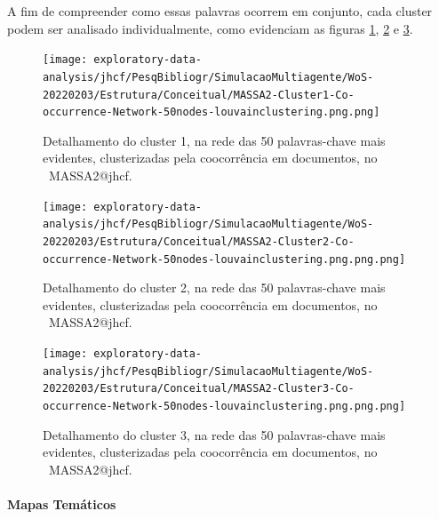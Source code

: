 A fim de compreender como essas palavras ocorrem em conjunto, cada cluster podem ser analisado individualmente, como evidenciam as figuras \ref{fig:MASSA2-Cluster1-Co-occurrence-Network-50nodes-louvainclustering.png}, \ref{fig:MASSA2-Cluster2-Co-occurrence-Network-50nodes-louvainclustering.png.png} e \ref{fig:MASSA2-Cluster3-Co-occurrence-Network-50nodes-louvainclustering.png.png}.

\begin{figure}
    \centering
    \texttt{[image: exploratory-data-analysis/jhcf/PesqBibliogr/SimulacaoMultiagente/WoS-20220203/Estrutura/Conceitual/MASSA2-Cluster1-Co-occurrence-Network-50nodes-louvainclustering.png.png]}
    \caption{Detalhamento do cluster 1, na rede das 50 palavras-chave mais evidentes, clusterizadas pela coocorrência em documentos, no  \dataset\ MASSA2@jhcf.}
    \label{fig:MASSA2-Cluster1-Co-occurrence-Network-50nodes-louvainclustering.png}
\end{figure}

\begin{figure}
    \centering
    \texttt{[image: exploratory-data-analysis/jhcf/PesqBibliogr/SimulacaoMultiagente/WoS-20220203/Estrutura/Conceitual/MASSA2-Cluster2-Co-occurrence-Network-50nodes-louvainclustering.png.png.png]}
    \caption{Detalhamento do cluster 2, na rede das 50 palavras-chave mais evidentes, clusterizadas pela coocorrência em documentos, no  \dataset\ MASSA2@jhcf.}
    \label{fig:MASSA2-Cluster2-Co-occurrence-Network-50nodes-louvainclustering.png.png}
\end{figure}

\begin{figure}
    \centering
    \texttt{[image: exploratory-data-analysis/jhcf/PesqBibliogr/SimulacaoMultiagente/WoS-20220203/Estrutura/Conceitual/MASSA2-Cluster3-Co-occurrence-Network-50nodes-louvainclustering.png.png.png]}
    \caption{Detalhamento do cluster 3, na rede das 50 palavras-chave mais evidentes, clusterizadas pela coocorrência em documentos, no  \dataset\ MASSA2@jhcf.}
    \label{fig:MASSA2-Cluster3-Co-occurrence-Network-50nodes-louvainclustering.png.png}
\end{figure}

\paragraph{Mapas Temáticos}


